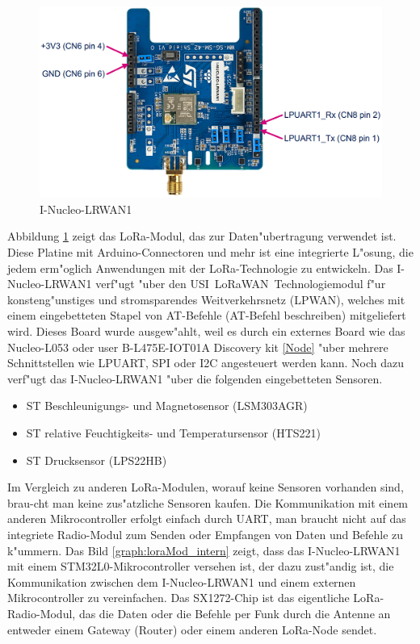  
\begin{figure}[h]
	\centering
	\includegraphics[width=14cm]{source/images/LoRa_mod}
	\caption{I-Nucleo-LRWAN1 \cite{LoRaMod}\label{graph:loraMod}}
\end{figure}

Abbildung \ref{graph:loraMod} zeigt das LoRa-Modul, das zur Daten"ubertragung verwendet ist. Diese Platine mit Arduino-Connectoren und mehr ist eine integrierte L"osung, die jedem erm"oglich Anwendungen mit der LoRa-Technologie zu entwickeln. Das I-Nucleo-LRWAN1 verf"ugt "uber den USI\textregistered\ LoRaWAN\texttrademark\ Technologiemodul f"ur konsteng"unstiges und stromsparendes Weitverkehrsnetz (LPWAN), welches mit einem eingebetteten Stapel von AT-Befehle (AT-Befehl beschreiben) mitgeliefert wird.
Dieses Board wurde ausgew"ahlt, weil es durch ein externes Board wie das Nucleo-L053 oder user B-L475E-IOT01A Discovery kit \ref{Node} "uber mehrere Schnittstellen wie LPUART, SPI oder I2C angesteuert werden kann. Noch dazu verf"ugt das I-Nucleo-LRWAN1 "uber die folgenden eingebetteten Sensoren.

\begin{itemize}
	\item ST Beschleunigungs- und Magnetosensor (LSM303AGR)
	\item ST relative Feuchtigkeits- und Temperatursensor (HTS221)
	\item ST Drucksensor (LPS22HB)
\end{itemize}

Im Vergleich zu anderen LoRa-Modulen, worauf keine Sensoren vorhanden sind, brau-cht man keine zus"atzliche Sensoren kaufen. Die Kommunikation mit einem anderen Mikrocontroller erfolgt einfach durch UART, man braucht nicht auf das integriete Radio-Modul zum Senden oder Empfangen von Daten und Befehle zu k"ummern. Das Bild \ref{graph:loraMod_intern} zeigt, dass das I-Nucleo-LRWAN1 mit einem STM32L0-Mikrocontroller versehen ist, der dazu zust"andig ist, die Kommunikation zwischen dem I-Nucleo-LRWAN1 und einem externen Mikrocontroller zu vereinfachen. Das SX1272-Chip ist das eigentliche LoRa-Radio-Modul, das die Daten oder die Befehle per Funk durch die Antenne an entweder einem Gateway (Router) oder einem anderen LoRa-Node  sendet. 

